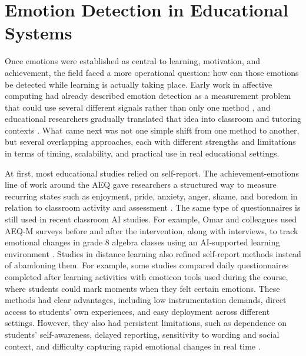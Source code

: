 \section{Emotion Detection in Educational Systems}\label{sec:emotion_detection_in_educational_systems}

Once emotions were established as central to learning, motivation, and achievement, the field faced a more operational question: how can those emotions be detected while learning is actually taking place. Early work in affective computing had already described emotion detection as a measurement problem that could use several different signals rather than only one method \cite{Picard1997AffectiveComputing}, and educational researchers gradually translated that idea into classroom and tutoring contexts \cite{Calvo2010AffectDetection}. What came next was not one simple shift from one method to another, but several overlapping approaches, each with different strengths and limitations in terms of timing, scalability, and practical use in real educational settings.

At first, most educational studies relied on self-report. The achievement-emotions line of work around the \ac{AEQ} gave researchers a structured way to measure recurring states such as enjoyment, pride, anxiety, anger, shame, and boredom in relation to classroom activity and assessment \cite{pekrun_control-value_2006,pekrun_academic_nodate}. The same type of questionnaires is still used in recent classroom AI studies. For example, Omar and colleagues used \ac{AEQ-M} surveys before and after the intervention, along with interviews, to track emotional changes in grade 8 algebra classes using an AI-supported learning environment \cite{omar_academic_2025}. Studies in distance learning also refined self-report methods instead of abandoning them. For example, some studies compared daily questionnaires completed after learning activities with emoticon tools used during the course, where students could mark moments when they felt certain emotions. These methods had clear advantages, including low instrumentation demands, direct access to students' own experiences, and easy deployment across different settings. However, they also had persistent limitations, such as dependence on students' self-awareness, delayed reporting, sensitivity to wording and social context, and difficulty capturing rapid emotional changes in real time \cite{Lavoue2017EmotionalDataCollection}.

